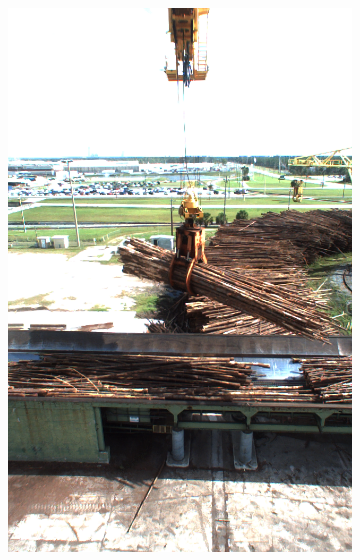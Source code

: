 	\begin{figure}[h]
		\centering
		\begin{subfigure}[c]{0.24\textwidth}			
			\includegraphics[width=1\textwidth]{bilder/Grundlagen/Logs_14.png}%
		\end{subfigure}
		\begin{subfigure}[c]{0.24\textwidth}			

\end{subfigure}
\end{figure}
